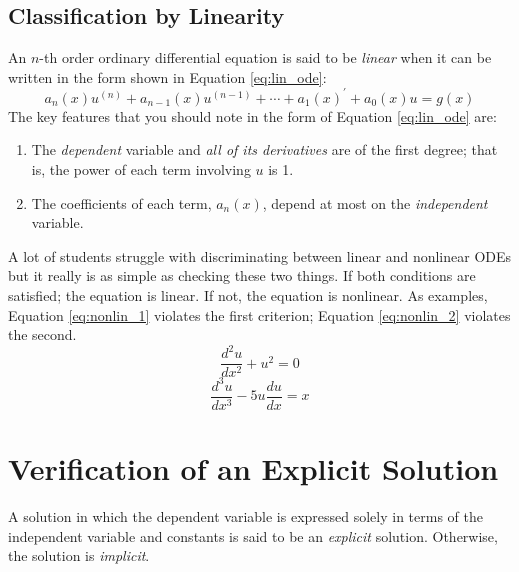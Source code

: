 \subsection{Classification by Linearity}
An $n$-th order ordinary differential equation is said to be \emph{linear} when it can be written in the form shown in Equation \ref{eq:lin_ode}:
\begin{equation}
a_n(x)u^{(n)}+a_{n-1}(x)u^{(n-1)}+\cdots+a_1(x)^{\prime}+a_0(x)u = g(x)
\label{eq:lin_ode}
\end{equation}
The key features that you should note in the form of Equation \ref{eq:lin_ode} are:
\begin{enumerate}
\item The \emph{dependent} variable and \emph{all of its derivatives} are of the first degree; that is, the power of each term involving $u$ is 1.
\item The coefficients of each term, $a_n(x)$, depend at most on the \emph{independent} variable.
\end{enumerate}
A lot of students struggle with discriminating between linear and nonlinear ODEs but it really is as simple as checking these two things.  If both conditions are satisfied; the equation is linear.  If not, the equation is nonlinear.  As examples, Equation \ref{eq:nonlin_1} violates the first criterion; Equation \ref{eq:nonlin_2} violates the second.
\begin{equation}
\frac{d^2u}{dx^2}+u^2 = 0 
\label{eq:nonlin_1}
\end{equation}
\begin{equation}
\frac{d^3u}{dx^3}-5u\frac{du}{dx}=x
\label{eq:nonlin_2}
\end{equation}
\section{Verification of an Explicit Solution} 
A solution in which the dependent variable is expressed solely in terms of the independent variable and constants is said to be an \emph{explicit} solution. Otherwise, the solution is \emph{implicit}. 

